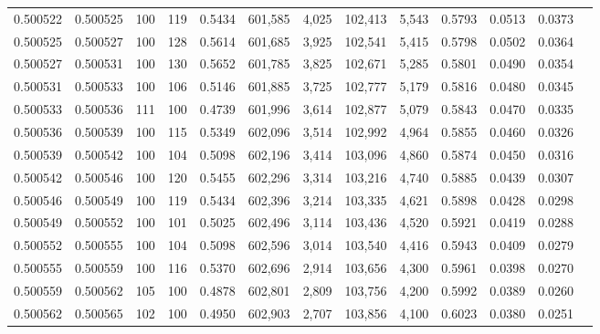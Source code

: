 \begin{tabular}{rrrrrrrrrrrrr}
0.500522 & 0.500525 &   100 & 119 &                                     0.5434 & 601,585 &   4,025 & 102,413 &   5,543 & 0.5793 & 0.0513 & 0.0373 \\
0.500525 & 0.500527 &   100 & 128 &                                     0.5614 & 601,685 &   3,925 & 102,541 &   5,415 & 0.5798 & 0.0502 & 0.0364 \\
0.500527 & 0.500531 &   100 & 130 &                                     0.5652 & 601,785 &   3,825 & 102,671 &   5,285 & 0.5801 & 0.0490 & 0.0354 \\
0.500531 & 0.500533 &   100 & 106 &                                     0.5146 & 601,885 &   3,725 & 102,777 &   5,179 & 0.5816 & 0.0480 & 0.0345 \\
0.500533 & 0.500536 &   111 & 100 &                                     0.4739 & 601,996 &   3,614 & 102,877 &   5,079 & 0.5843 & 0.0470 & 0.0335 \\
0.500536 & 0.500539 &   100 & 115 &                                     0.5349 & 602,096 &   3,514 & 102,992 &   4,964 & 0.5855 & 0.0460 & 0.0326 \\
0.500539 & 0.500542 &   100 & 104 &                                     0.5098 & 602,196 &   3,414 & 103,096 &   4,860 & 0.5874 & 0.0450 & 0.0316 \\
0.500542 & 0.500546 &   100 & 120 &                                     0.5455 & 602,296 &   3,314 & 103,216 &   4,740 & 0.5885 & 0.0439 & 0.0307 \\
0.500546 & 0.500549 &   100 & 119 &                                     0.5434 & 602,396 &   3,214 & 103,335 &   4,621 & 0.5898 & 0.0428 & 0.0298 \\
0.500549 & 0.500552 &   100 & 101 &                                     0.5025 & 602,496 &   3,114 & 103,436 &   4,520 & 0.5921 & 0.0419 & 0.0288 \\
0.500552 & 0.500555 &   100 & 104 &                                     0.5098 & 602,596 &   3,014 & 103,540 &   4,416 & 0.5943 & 0.0409 & 0.0279 \\
0.500555 & 0.500559 &   100 & 116 &                                     0.5370 & 602,696 &   2,914 & 103,656 &   4,300 & 0.5961 & 0.0398 & 0.0270 \\
0.500559 & 0.500562 &   105 & 100 &                                     0.4878 & 602,801 &   2,809 & 103,756 &   4,200 & 0.5992 & 0.0389 & 0.0260 \\
0.500562 & 0.500565 &   102 & 100 &                                     0.4950 & 602,903 &   2,707 & 103,856 &   4,100 & 0.6023 & 0.0380 & 0.0251 \\

\end{tabular}
